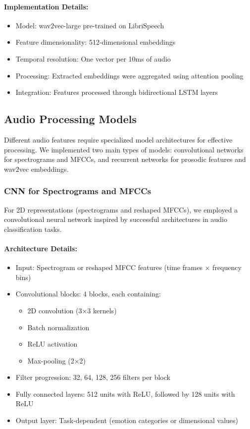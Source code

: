 \documentclass[12pt]{article}
\begin{document}
\paragraph{Implementation Details:}
\begin{itemize}
    \item Model: wav2vec-large pre-trained on LibriSpeech
    \item Feature dimensionality: 512-dimensional embeddings
    \item Temporal resolution: One vector per 10ms of audio
    \item Processing: Extracted embeddings were aggregated using attention pooling
    \item Integration: Features processed through bidirectional LSTM layers
\end{itemize}

\subsection{Audio Processing Models}
Different audio features require specialized model architectures for effective processing. We implemented two main types of models: convolutional networks for spectrograms and MFCCs, and recurrent networks for prosodic features and wav2vec embeddings.

\subsubsection{CNN for Spectrograms and MFCCs}
For 2D representations (spectrograms and reshaped MFCCs), we employed a convolutional neural network inspired by successful architectures in audio classification tasks.

\paragraph{Architecture Details:}
\begin{itemize}
    \item Input: Spectrogram or reshaped MFCC features (time frames × frequency bins)
    \item Convolutional blocks: 4 blocks, each containing:
    \begin{itemize}
        \item 2D convolution (3×3 kernels)
        \item Batch normalization
        \item ReLU activation
        \item Max-pooling (2×2)
    \end{itemize}
    \item Filter progression: 32, 64, 128, 256 filters per block
    \item Fully connected layers: 512 units with ReLU, followed by 128 units with ReLU
    \item Output layer: Task-dependent (emotion categories or dimensional values)
\end{itemize}
\end{document}
